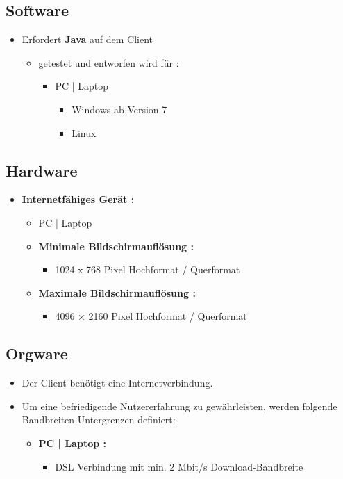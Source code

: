 	\subsection{Software}
	\begin{itemize}
		\item Erfordert \textbf{Java} auf dem Client
		\begin{itemize}
			\item getestet und entworfen wird für :
			\begin{itemize}
				\item PC | Laptop
				\begin{itemize}
					\item Windows ab Version 7
					\item Linux
				\end{itemize}
			\end{itemize}
		\end{itemize}
	\end{itemize}
	\subsection{Hardware}
	\begin{itemize}
		\item \textbf{Internetfähiges Gerät :}
		\begin{itemize}
			\item PC | Laptop
			\item \textbf{Minimale Bildschirmauflösung :}
				\begin{itemize}
					\item 1024 x 768 Pixel Hochformat / Querformat
				\end{itemize}
					\item \textbf{Maximale Bildschirmauflösung :}
				\begin{itemize}
				\item 4096 × 2160 Pixel Hochformat / Querformat
				\end{itemize}		
		\end{itemize}
	\end{itemize}
	\subsection{Orgware}
	\begin{itemize}
		\item Der Client benötigt eine Internetverbindung.
		\item Um eine befriedigende Nutzererfahrung zu gewährleisten, werden folgende Bandbreiten-Untergrenzen definiert:
		\begin{itemize}
			\item \textbf{ PC | Laptop :}
			\begin{itemize}
				\item DSL Verbindung mit min. 2 Mbit/s Download-Bandbreite
			\end{itemize}
		\end{itemize}
	\end{itemize}
